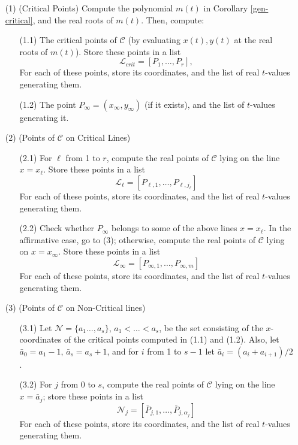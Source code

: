 \documentclass{elsart}
\begin{document}
\begin{itemize}
\item [(1)] (Critical Points) Compute the polynomial $m(t)$ in Corollary \ref{gen-critical}, and the real roots of $m(t)$. Then, compute:
 \begin{itemize}
 \item [(1.1)] The critical points of ${\mathcal C}$ (by evaluating $x(t),y(t)$ at the real roots of $m(t)$). Store these points in a list \[{\mathcal L}_{crit}=[P_1, \ldots,P_r],\]For each of these points, store its coordinates, and the list of real $t$-values generating them.
 \item [(1.2)] The point $P_{\infty}=(x_{\infty},y_{\infty})$ (if it exists), and the list of $t$-values generating it.
 \end{itemize}
\item [(2)] (Points of ${\mathcal C}$ on Critical Lines)
\begin{itemize}
\item [(2.1)] For $\ell$ from 1 to $r$, compute the real points of ${\mathcal C}$ lying on the line $x=x_{\ell}$. Store these points in a list
    \[{\mathcal L}_{\ell}=[P_{\ell,1},\ldots,P_{\ell,j_{\ell}}]\]For each of these points, store its coordinates, and the list of real $t$-values generating them.
\item [(2.2)] Check whether $P_{\infty}$ belongs to some of the above lines $x=x_{\ell}$. In the affirmative case, go to (3); otherwise,
compute the real points of ${\mathcal C}$ lying on $x=x_{\infty}$. Store these points in a list
\[{\mathcal L}_{\infty}=[P_{\infty,1},\ldots,P_{\infty,m}]\]For each of these points, store its coordinates, and the list of real $t$-values generating them.
    \end{itemize}
    \item [(3)] (Points of ${\mathcal C}$ on Non-Critical lines)
    \begin{itemize}
    \item [(3.1)] Let ${\mathcal N}=\{a_1\ldots,a_{s}\}$, $a_1<\ldots<a_{s}$, be the set consisting
    of the $x$-coordinates of the critical points computed in (1.1) and (1.2). Also, let $\bar{a}_0=a_1-1$, $\bar{a}_{s}=a_s+1$,
    and for $i$ from 1 to
    $s-1$ let $\bar{a}_i=(a_i+a_{i+1})/2$.
        \item [(3.2)] For $j$ from 0 to $s$, compute the real points of ${\mathcal C}$ lying on the line $x=\bar{a}_j$; store these points in a list
            \[{\mathcal N}_j=[\bar{P}_{j,1},\ldots,\bar{P}_{j,\alpha_j}]\]For each of these points, store its coordinates, and the list of real $t$-values generating them.

\end{itemize}
\end{itemize}
\end{document}
